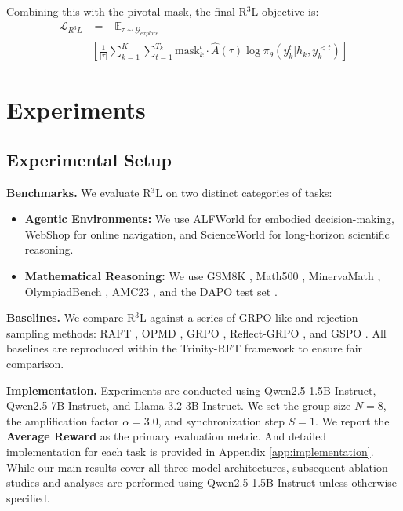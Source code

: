 \documentclass[11pt]{article}
\begin{document}
Combining this with the pivotal mask, the final R$^3$L objective is:
\begin{equation}
\begin{split}
    \mathcal{L}_{R^3L} &= -\mathbb{E}_{\tau \sim \mathcal{G}_{explore}} \\
    & \left[ \frac{1}{|\tau|} \sum_{k=1}^{K} \sum_{t=1}^{T_k} \text{mask}_k^t \cdot \hat{A}(\tau) \log \pi_{\theta}(y_k^t | h_k, y_k^{<t}) \right]
\end{split}
\label{eq:R3L}
\end{equation}

\section{Experiments}
\subsection{Experimental Setup}
\textbf{Benchmarks.} We evaluate R$^3$L on two distinct categories of tasks:
\begin{itemize}
    \item \textbf{Agentic Environments:} We use ALFWorld \cite{shridhar2020alfworld} for embodied decision-making, WebShop \cite{yao2022webshop} for online navigation, and ScienceWorld \cite{wang2022scienceworld} for long-horizon scientific reasoning.
    \item \textbf{Mathematical Reasoning:} We use GSM8K \cite{cobbe2021training}, Math500 \cite{lightman2023let}, MinervaMath \cite{lewkowycz2022solving}, OlympiadBench \cite{gao2024omni}, AMC23 \cite{amc}, and the DAPO test set \cite{yu2025dapo}.
\end{itemize}

\textbf{Baselines.} We compare R$^3$L against a series of GRPO-like and rejection sampling methods: RAFT \cite{dongraft}, OPMD \cite{yao2025group}, GRPO \cite{shao2024deepseekmath}, Reflect-GRPO \cite{bensal2025reflect}, and GSPO \cite{zheng2025group}. All baselines are reproduced within the Trinity-RFT framework \cite{pan2025trinity} to ensure fair comparison.

\textbf{Implementation.} Experiments are conducted using Qwen2.5-1.5B-Instruct, Qwen2.5-7B-Instruct, and Llama-3.2-3B-Instruct. We set the group size $N=8$, the amplification factor $\alpha=3.0$, and synchronization step $S=1$. We report the \textbf{Average Reward} as the primary evaluation metric. And detailed implementation for each task is provided in Appendix \ref{app:implementation}. While our main results cover all three model architectures, subsequent ablation studies and analyses are performed using Qwen2.5-1.5B-Instruct unless otherwise specified.
\end{document}
